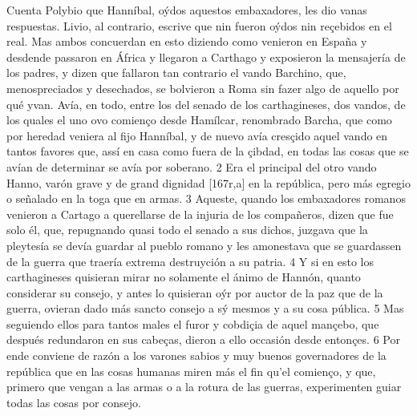 \documentclass[11pt,twoside]{article}\makeatletter
\def\persName{}\def\name{}
\def\placeName{}
\begin{document}
\pend
{} Cuenta  {\persName Polybio} que  {\persName Hanníbal}, oýdos aquestos embaxadores, les dio vanas respuestas.  {\persName  {\persName Livio}}, al contrario, escrive que nin fueron oýdos nin reçebidos en el real. Mas ambos concuerdan en esto diziendo como venieron en  {\placeName España} y desdende passaron en  {\placeName África} y llegaron a  {\placeName Carthago} y exposieron la mensajería de los padres, y dizen que fallaron tan contrario el vando Barchino, que, menospreciados y desechados, se bolvieron a  {\placeName Roma} sin fazer algo de aquello por qué yvan.
\pend
{} Avía, en todo, entre los del senado de los  {\name carthagineses}, dos vandos, de los quales el uno ovo comienço desde  {\persName Hamílcar}, renombrado Barcha, que como por heredad veniera al fijo  {\persName Hanníbal}, y de nuevo avía cresçido aquel vando en tantos favores que, assí en casa como fuera de la çibdad, en todas las cosas que se avían de determinar se avía por soberano. 2 Era el principal del otro vando Hanno, varón grave y de grand dignidad %
[167r,a] en la república, pero más egregio o señalado en la toga que en armas. 3 Aqueste, quando los embaxadores romanos venieron a  {\placeName Cartago} a querellarse de la injuria de los compañeros, dizen que fue solo él, que, repugnando quasi todo el senado a sus dichos, juzgava que la pleytesía se devía guardar al pueblo romano y les amonestava que se guardassen de la guerra que traería extrema destruyción a su patria. 4 Y si en esto los  {\name carthagineses} quisieran mirar no solamente el ánimo de  {\persName Hannón}, quanto considerar su consejo, y antes lo quisieran oýr por auctor de la paz que de la guerra, ovieran dado más sancto consejo a sý mesmos y a su cosa pública. 5 Mas seguiendo ellos para tantos males el furor y cobdiçia de aquel mançebo, que después redundaron en sus cabeças, dieron a ello occasión desde entonçes. 6 Por ende conviene de razón a los varones sabios y muy buenos governadores de la república que en las cosas humanas miren más el fin qu'el comienço, y que, primero que vengan a las armas o a la rotura de las guerras, experimenten guiar todas las cosas por consejo.
\pend
\pstart
\end{document}
